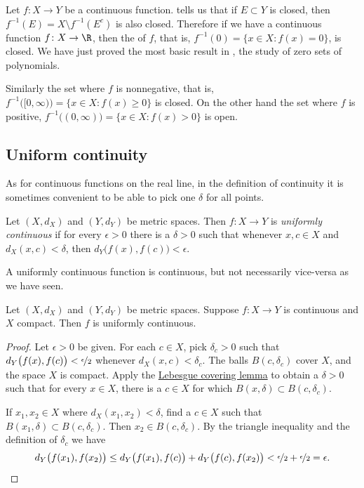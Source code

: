 \documentclass[12pt]{book}
\begin{document}
\begin{example}
Let $f \colon X \to Y$ be a continuous function.
 tells us that if $E \subset Y$ is closed, then 
$f^{-1}(E) = X \setminus f^{-1}(E^c)$ is also closed.
Therefore if
we have a continuous
function $f \colon X \to \R$, then the
\emph{} of $f$, that is, 
$f^{-1}(0) = \{ x \in X :
f(x) = 0 \}$, is closed.
We have just proved the most basic result in
\emph{}, the study of
zero sets of polynomials.

Similarly the set where $f$ is nonnegative, that is,
$f^{-1}\bigl( [0,\infty) \bigr) = \{ x \in X :
f(x) \geq 0 \}$ is closed.
On the other hand the
set where $f$ is positive,
$f^{-1}\bigl( (0,\infty) \bigr) = \{ x \in X :
f(x) > 0 \}$ is open.
\end{example}

\subsection*{Uniform continuity}

As for continuous
functions on the real line, in the definition of continuity
it is sometimes convenient to be able to pick
one $\delta$ for all points.

\begin{defn}
Let $(X,d_X)$ and $(Y,d_Y)$ be metric spaces.
Then $f \colon X \to Y$ is
\emph{uniformly continuous}
if for every $\epsilon > 0$
there is a $\delta > 0$ such that whenever $x,c \in X$ and $d_X(x,c) <
\delta$, then
$d_Y\bigl(f(x),f(c)\bigr) < \epsilon$.
\end{defn}

A uniformly continuous function is continuous, but not necessarily
vice-versa as we have seen.

\begin{thm} \label{thm:Xcompactfunifcont}
Let $(X,d_X)$ and $(Y,d_Y)$ be metric spaces.
Suppose $f \colon X \to Y$ is continuous and $X$ compact.
Then
$f$ is uniformly continuous.
\end{thm}

\begin{proof}
Let $\epsilon > 0$ be given.
For each $c \in X$, pick $\delta_c > 0$ such that
$d_Y\bigl(f(x),f(c)\bigr) < \nicefrac{\epsilon}{2}$
whenever
$d_X(x,c) < \delta_c$.
The balls
$B(c,\delta_c)$ cover $X$, and the space $X$ is compact.  
Apply the \hyperref[ms:lebesgue]{Lebesgue covering lemma} to obtain a 
$\delta > 0$ such that for every $x \in X$, there is a $c \in X$
for which $B(x,\delta) \subset B(c,\delta_c)$.

If $x_1, x_2 \in X$ where $d_X(x_1,x_2) < \delta$,
find a $c \in X$ such that $B(x_1,\delta) \subset B(c,\delta_c)$.
Then $x_2 \in B(c,\delta_c)$.
By the triangle inequality
and the definition of $\delta_c$ we have
\begin{equation*}
d_Y\bigl(f(x_1),f(x_2)\bigr)
\leq
d_Y\bigl(f(x_1),f(c)\bigr)
+
d_Y\bigl(f(c),f(x_2)\bigr)
<
\nicefrac{\epsilon}{2}+
\nicefrac{\epsilon}{2} = \epsilon .  \qedhere
\end{equation*}
\end{proof}
\end{document}

